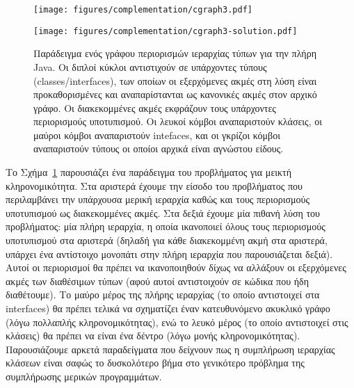 {\en
\begin{figure}[th]
  \renewcommand\figurename{{\gr Σχήμα}}
  \begin{minipage}[b]{.5\linewidth}
    \centering
    \texttt{[image: figures/complementation/cgraph3.pdf]}
    \label{synopsis/fig:real-example:problem}
  \end{minipage}
  \begin{minipage}[b]{.5\linewidth}
    \centering
    \texttt{[image: figures/complementation/cgraph3-solution.pdf]}
    \label{synopsis/fig:real-example:solution}
  \end{minipage}
  \caption[]{{\gr Παράδειγμα ενός γράφου περιορισμών ιεραρχίας τύπων
      για την πλήρη {\en Java}. Οι διπλοί κύκλοι αντιστιχούν σε
      υπάρχοντες τύπους ({\en classes/interfaces}), των οποίων οι
      εξερχόμενες ακμές στη λύση είναι προκαθορισμένες και
      αναπαρίστανται ως κανονικές ακμές στον αρχικό γράφο. Οι
      διακεκομμένες ακμές εκφράζουν τους υπάρχοντες περιορισμούς
      υποτυπισμού. Οι λευκοί κόμβοι αναπαριστούν κλάσεις, οι μαύροι
      κόμβοι αναπαριστούν {\en intefaces}, και οι γκρίζοι κόμβοι
      αναπαριστούν τύπους οι οποίοι αρχικά είναι αγνώστου είδους.}}
  \label{synopsis/fig:real-example}
\end{figure}}

Το Σχήμα~\ref{synopsis/fig:real-example} παρουσιάζει ένα παράδειγμα
του προβλήματος για μεικτή κληρονομικότητα. Στα αριστερά έχουμε την
είσοδο του προβλήματος που περιλαμβάνει την υπάρχουσα μερική ιεραρχία
καθώς και τους περιορισμούς υποτυπισμού ως διακεκομμένες ακμές. Στα
δεξιά έχουμε μία πιθανή λύση του προβλήματος: μία πλήρη ιεραρχία, η
οποία ικανοποιεί όλους τους περιορισμούς υποτυπισμού στα αριστερά
(δηλαδή για κάθε διακεκομμένη ακμή στα αριστερά, υπάρχει ένα
αντίστοιχο μονοπάτι στην πλήρη ιεραρχία που παρουσιάζεται δεξιά).
Αυτοί οι περιορισμοί θα πρέπει να ικανοποιηθούν δίχως να αλλάξουν οι
εξερχόμενες ακμές των διαθέσιμων τύπων (αφού αυτοί αντιστοιχούν σε
κώδικα που ήδη διαθέτουμε). Το μαύρο μέρος της πλήρης ιεραρχίας (το
οποίο αντιστοιχεί στα {\en interfaces}) θα πρέπει τελικά να σχηματίζει
έναν κατευθυνόμενο ακυκλικό γράφο (λόγω πολλαπλής κληρονομικότητας),
ενώ το λευκό μέρος (το οποίο αντιστοιχεί στις κλάσεις) θα πρέπει να
είναι ένα δέντρο (λόγω μονής κληρονομικότητας).
%
Παρουσιάζουμε αρκετά παραδείγματα που δείχνουν πως η συμπλήρωση
ιεραρχίας κλάσεων είναι σαφώς το δυσκολότερο βήμα στο γενικότερο
πρόβλημα της συμπλήρωσης μερικών προγραμμάτων.


